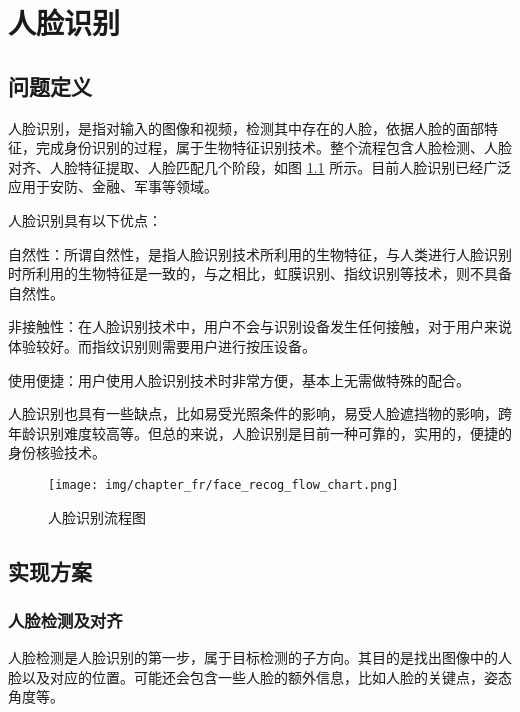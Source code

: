 %
%
%
\chapter{人脸识别}
\label{basic} %


\section{问题定义}
人脸识别，是指对输入的图像和视频，检测其中存在的人脸，依据人脸的面部特征，完成身份识别的过程，属于生物特征识别技术。整个流程包含人脸检测、人脸对齐、人脸特征提取、人脸匹配几个阶段，如图 \ref{fig:face_recog_flow_chart} 所示。目前人脸识别已经广泛应用于安防、金融、军事等领域。

人脸识别具有以下优点：

自然性：所谓自然性，是指人脸识别技术所利用的生物特征，与人类进行人脸识别时所利用的生物特征是一致的，与之相比，虹膜识别、指纹识别等技术，则不具备自然性。

非接触性：在人脸识别技术中，用户不会与识别设备发生任何接触，对于用户来说体验较好。而指纹识别则需要用户进行按压设备。

使用便捷：用户使用人脸识别技术时非常方便，基本上无需做特殊的配合。

人脸识别也具有一些缺点，比如易受光照条件的影响，易受人脸遮挡物的影响，跨年龄识别难度较高等。但总的来说，人脸识别是目前一种可靠的，实用的，便捷的身份核验技术。

\begin{figure}[ht]
\centering
\texttt{[image: img/chapter\_fr/face\_recog\_flow\_chart.png]}
\caption{人脸识别流程图}
\label{fig:face_recog_flow_chart}
\end{figure}

\section{实现方案}
\subsection{人脸检测及对齐}
人脸检测是人脸识别的第一步，属于目标检测的子方向。其目的是找出图像中的人脸以及对应的位置。可能还会包含一些人脸的额外信息，比如人脸的关键点，姿态角度等。

